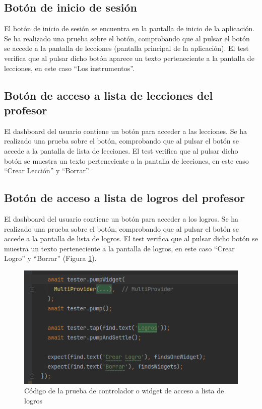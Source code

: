 \subsection{Botón de inicio de sesión}
\label{subsec:pruebas-controlador-boton-inicio-sesión}
El botón de inicio de sesión se encuentra en la pantalla de inicio de la aplicación. Se ha realizado una prueba sobre el botón, comprobando que al pulsar el botón se accede a la pantalla de lecciones (pantalla principal de la aplicación).
El test verifica que al pulsar dicho botón aparece un texto perteneciente a la pantalla de lecciones, en este caso ``Los instrumentos''.

\subsection{Botón de acceso a lista de lecciones del profesor}
\label{subsec:pruebas-controlador-boton-lecciones}
El dashboard del usuario contiene un botón para acceder a las lecciones. Se ha realizado una prueba sobre el botón, comprobando que al pulsar el botón se accede a la pantalla de lista de lecciones. 
El test verifica que al pulsar dicho botón se muestra un texto perteneciente a la pantalla de lecciones, en este caso ``Crear Lección'' y ``Borrar''.

\subsection{Botón de acceso a lista de logros del profesor}
\label{subsec:pruebas-controlador-boton-logros}
El dashboard del usuario contiene un botón para acceder a los logros. Se ha realizado una prueba sobre el botón, comprobando que al pulsar el botón se accede a la pantalla de lista de logros. 
El test verifica que al pulsar dicho botón se muestra un texto perteneciente a la pantalla de logros, en este caso ``Crear Logro'' y ``Borrar'' (Figura \ref{fig:prueba_lista_logros}).
\begin{figure}[H]
    \centering
    \includegraphics[width=\textwidth]{imagenes/c8/pruebawidget1.png}
    \caption{Código de la prueba de controlador o widget de acceso a lista de logros}
    \label{fig:prueba_lista_logros}
\end{figure}


